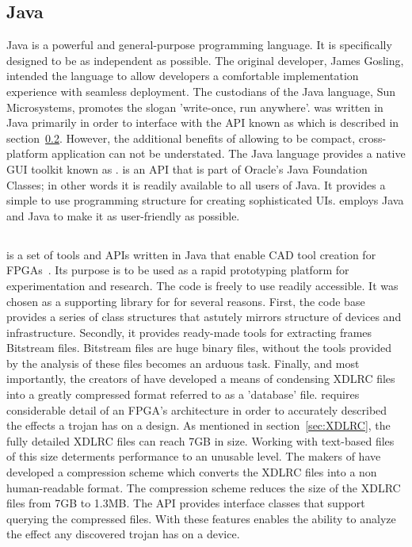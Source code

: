 \subsection{Java} \label{sec:java}
Java is a powerful and general-purpose programming language. 
It is specifically designed to be as independent as possible.
The original developer, James Gosling, intended the language to allow developers a comfortable implementation experience with seamless deployment. 
The custodians of the Java language, Sun Microsystems, promotes the slogan 'write-once, run anywhere'.  
\NameNoPeriod was written in Java primarily in order to interface with the \acrshort{API} known as \RapidSmith which is described in section~\ref{sec:rapidSmith}.
However, the additional benefits of allowing \NameNoPeriod to be compact, cross-platform application can not be understated.
The Java language provides a native \acrfull{GUI} toolkit known as \Swing.
\Swing is an \acrshort{API} that is part of Oracle's Java Foundation Classes; in other words it is readily available to all users of Java.
It provides a simple to use programming structure for creating sophisticated \acrshort{UIs}.
\NameNoPeriod employs Java and Java \Swing to make it as user-friendly as possible. 

\subsection{\RapidSmith} \label{sec:rapidSmith}
\RapidSmith is a set of tools and \acrfull{APIs} written in Java that enable \acrfull{CAD} tool creation for \Xilinx \acrshort{FPGA}s~\cite{rapidSmith}.
Its purpose is to be used as a rapid prototyping platform for experimentation and research.
The code is freely to use readily accessible.
It was chosen as a supporting library for \NameNoPeriod for several reasons.
First, the code base provides a series of class structures that astutely mirrors structure of \Xilinx devices and infrastructure.
Secondly, it provides ready-made tools for extracting frames \gls{Bitstream} files. 
\gls{Bitstream} files are huge binary files, without the tools provided by \RapidSmith the analysis of these files becomes an arduous task.
Finally, and most importantly, the creators of \RapidSmith have developed a means of condensing XDLRC files into a greatly compressed format referred to as a 'database' file.
\NameNoPeriod requires considerable detail of an \acrshort{FPGA}'s architecture in order to accurately described the effects a trojan has on a design.
As mentioned in section~\ref{sec:XDLRC}, the fully detailed XDLRC files can reach 7GB in size.
Working with text-based files of this size determents performance to an unusable level.
The makers of \RapidSmith have developed a compression scheme which converts the XDLRC files into a non human-readable format.
The compression scheme reduces the size of the XDLRC files from 7GB to 1.3MB. 
The \acrshort{API} provides interface classes that support querying the compressed files.
With these features \RapidSmith enables the ability to analyze the effect any discovered trojan has on a device.
